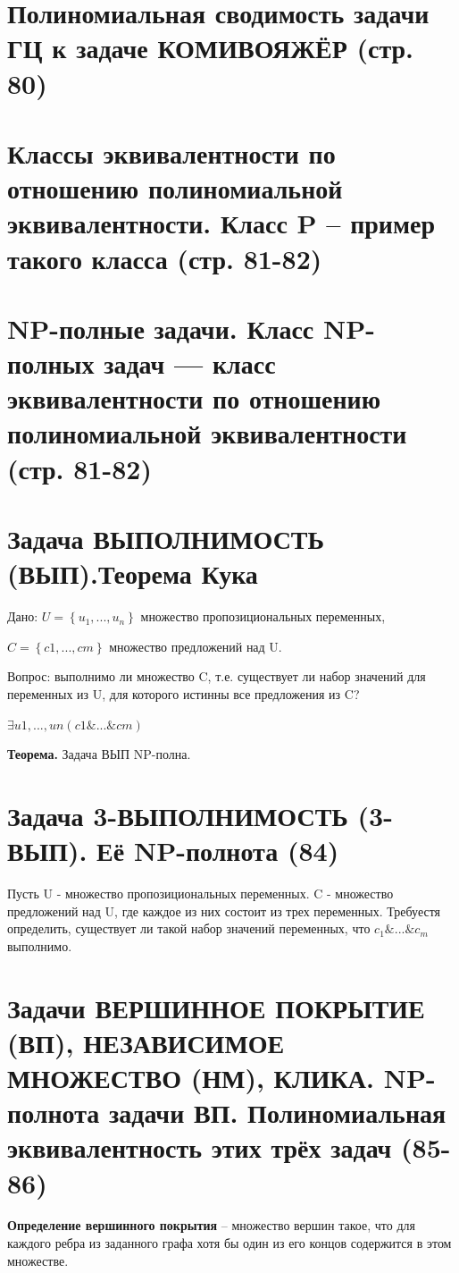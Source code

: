\documentclass[40pt]{article}
\begin{document}
\section{Полиномиальная сводимость задачи ГЦ к задаче КОМИВОЯЖЁР (стр. 80)}


\section{Классы эквивалентности по отношению полиномиальной эквивалентности. Класс P – пример такого класса (стр. 81-82)}
\section{NP-полные задачи. Класс NP-полных задач — класс эквивалентности по отношению полиномиальной эквивалентности (стр. 81-82)}
\section{Задача ВЫПОЛНИМОСТЬ (ВЫП).Теорема Кука}

Дано: $U = \left\{u_1, ..., u_n\right\}$ множество пропозициональных переменных,

$C = \left\{c1, ..., cm\right\}$ множество предложений над U.

Вопрос: выполнимо ли множество C, т.е. существует ли набор значений
для переменных из U, для которого истинны все предложения из C?

$\exists u1, ..., un(c1 \& ... \& cm)$

\textbf{Теорема.} Задача ВЫП NP-полна.


\section{Задача 3-ВЫПОЛНИМОСТЬ (3-ВЫП). Её NP-полнота (84)}

\par Пусть U - множество пропозициональных переменных. C - множество предложений над U, где каждое из них состоит из трех переменных. Требуестя определить, существует ли такой набор значений переменных, что $c_1\&...\&c_m$ выполнимо.

\section{Задачи ВЕРШИННОЕ ПОКРЫТИЕ (ВП), НЕЗАВИСИМОЕ МНОЖЕСТВО (НМ), КЛИКА.  NP-полнота задачи ВП.  Полиномиальная эквивалентность этих трёх задач (85-86)}

 \par \textbf{Определение вершинного покрытия} -- множество вершин такое, что для каждого ребра из заданного графа хотя бы один из его концов содержится в этом множестве.
 
\end{document}
